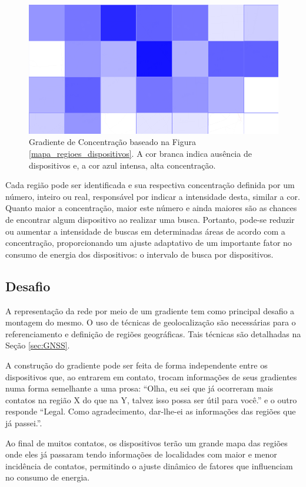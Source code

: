 \begin{figure}[htp!]
\centering
\includegraphics[width=1.0\textwidth]{figuras/cap_2/secao_2/gradiente_mapa_regioes_dispositivos.png}
\caption{Gradiente de Concentração baseado na Figura \ref{mapa_regioes_dispositivos}. A cor branca indica ausência de dispositivos e, a cor azul intensa, alta concentração.}
\label{gradiente_mapa_regioes_dispositivos}
\end{figure}

Cada região pode ser identificada e sua respectiva concentração definida por um número, inteiro ou real, responsável por indicar a intensidade desta, similar a cor. Quanto maior a concentração, maior este número e ainda maiores são as chances de encontrar algum dispositivo ao realizar uma busca. Portanto, pode-se reduzir ou aumentar a intensidade de buscas em determinadas áreas de acordo com a concentração, proporcionando um ajuste adaptativo de um importante fator no consumo de energia dos dispositivos: o intervalo de busca por dispositivos.

\subsection{Desafio}
\label{subsec:gradientes_desafios}
A representação da rede por meio de um gradiente tem como principal desafio a montagem do mesmo. O uso de técnicas de geolocalização são necessárias para o referenciamento e definição de regiões geográficas. Tais técnicas são detalhadas na Seção \ref{sec:GNSS}.

A construção do gradiente pode ser feita de forma independente entre os dispositivos que, ao entrarem em contato, trocam informações de seus gradientes numa forma semelhante a uma prosa: “Olha, eu sei que já ocorreram mais contatos na região X do que na Y, talvez isso possa ser útil para você.” e o outro responde “Legal. Como agradecimento, dar-lhe-ei as informações das regiões que já passei.”. 

Ao final de muitos contatos, os dispositivos terão um grande mapa das regiões onde eles já passaram tendo informações de localidades com maior e menor incidência de contatos, permitindo o ajuste dinâmico de fatores que influenciam no consumo de energia.